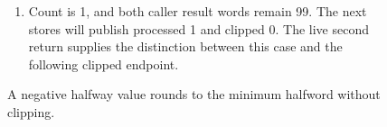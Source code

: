 \begin{figure}[htbp]
\begin{minipage}{\linewidth}
\begin{enumerate}
      \item Count is 1, and both caller result words remain 99. The next stores will publish processed 1 and clipped 0. The live second return supplies the distinction between this case and the following clipped endpoint.
    \end{enumerate}
  \end{minipage}
  \caption{A negative halfway value rounds to the minimum halfword without clipping.}
  \label{capture:021-fixed-point-fir-f03}
  \label{fir-f03}
\end{figure}
\par
